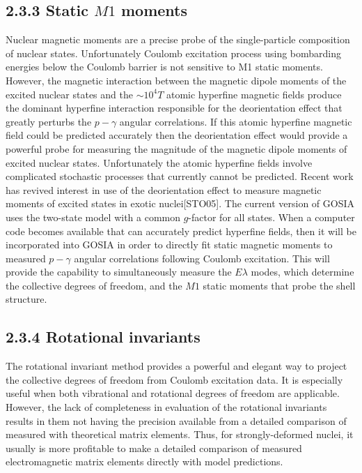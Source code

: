 \documentclass[10pt]{article}
\begin{document}
\subsection*{2.3.3 Static $M 1$ moments}
Nuclear magnetic moments are a precise probe of the single-particle composition of nuclear states. Unfortunately Coulomb excitation process using bombarding energies below the Coulomb barrier is not sensitive to M1 static moments. However, the magnetic interaction between the magnetic dipole moments of the excited nuclear states and the $\sim 10^{4} T$ atomic hyperfine magnetic fields produce the dominant hyperfine interaction responsible for the deorientation effect that greatly perturbs the $p-\gamma$ angular correlations. If this atomic hyperfine magnetic field could be predicted accurately then the deorientation effect would provide a powerful probe for measuring the magnitude of the magnetic dipole moments of excited nuclear states. Unfortunately the atomic hyperfine fields involve complicated stochastic processes that currently cannot be predicted. Recent work has revived interest in use of the deorientation effect to measure magnetic moments of excited states in exotic nuclei[STO05]. The current version of GOSIA uses the two-state model with a common $g$-factor for all states. When a computer code becomes available that can accurately predict hyperfine fields, then it will be incorporated into GOSIA in order to directly fit static magnetic moments to measured $p-\gamma$ angular correlations following Coulomb excitation. This will provide the capability to simultaneously measure the $E \lambda$ modes, which determine the collective degrees of freedom, and the $M 1$ static moments that probe the shell structure.

\subsection*{2.3.4 Rotational invariants}
The rotational invariant method provides a powerful and elegant way to project the collective degrees of freedom from Coulomb excitation data. It is especially useful when both vibrational and rotational degrees of freedom are applicable. However, the lack of completeness in evaluation of the rotational invariants results in them not having the precision available from a detailed comparison of measured with theoretical matrix elements. Thus, for strongly-deformed nuclei, it usually is more profitable to make a detailed comparison of measured electromagnetic matrix elements directly with model predictions.
\end{document}
